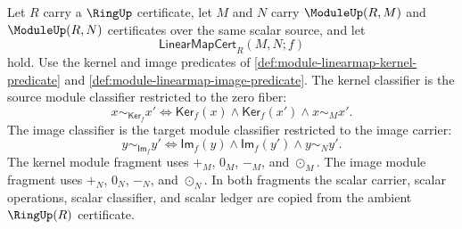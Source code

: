 \begin{definition}
\label{def:module-linearmap-kernel-image-restricted-classifiers}
Let $R$ carry a $\RingUp$ certificate, let $M$ and $N$ carry $\ModuleUp(R,M)$ and $\ModuleUp(R,N)$ certificates over the same scalar source, and let
$$
\mathsf{LinearMapCert}_R(M,N;f)
$$
hold. Use the kernel and image predicates of \autoref{def:module-linearmap-kernel-predicate} and \autoref{def:module-linearmap-image-predicate}. The kernel classifier is the source module classifier restricted to the zero fiber:
$$
x\sim_{\mathsf{Ker}_f}x'
\Longleftrightarrow
\mathsf{Ker}_f(x)\land\mathsf{Ker}_f(x')\land x\sim_Mx'.
$$
The image classifier is the target module classifier restricted to the image carrier:
$$
y\sim_{\mathsf{Im}_f}y'
\Longleftrightarrow
\mathsf{Im}_f(y)\land\mathsf{Im}_f(y')\land y\sim_Ny'.
$$
The kernel module fragment uses $+_M$, $0_M$, $-_M$, and $\odot_M$. The image module fragment uses $+_N$, $0_N$, $-_N$, and $\odot_N$. In both fragments the scalar carrier, scalar operations, scalar classifier, and scalar ledger are copied from the ambient $\RingUp(R)$ certificate.
\end{definition}

